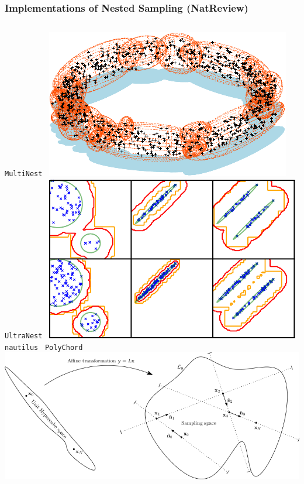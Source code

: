 \documentclass[aspectratio=169]{beamer}
\begin{document}
\begin{frame}
    \frametitle{Implementations of Nested Sampling (NatReview)}
    \begin{columns}[t]
        \texttt{MultiNest}~
        \includegraphics[width=\textwidth]{figures/multinest}
        \texttt{UltraNest}~
        \includegraphics[width=\textwidth]{figures/radfriends}
        \texttt{nautilus}~ 
        \texttt{PolyChord}~
        \includegraphics[width=\textwidth]{figures/polychord}

\end{columns}
\end{frame}
\end{document}
